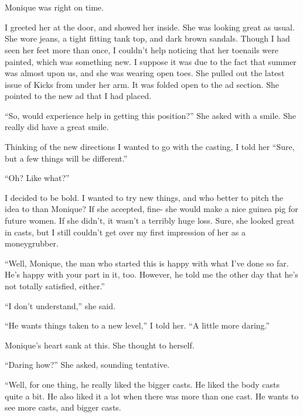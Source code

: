 \chapter{~}
Monique was right on time.

I greeted her at the door, and showed her inside. She was looking great as usual. She wore
jeans, a tight fitting tank top, and dark brown sandals. Though I had seen her feet more than
once, I couldn't help noticing that her toenails were painted, which was something new. I
suppose it was due to the fact that summer was almost upon us, and she was wearing open toes.
She pulled out the latest issue of Kicks from under her arm. It was folded open to the ad
section. She pointed to the new ad that I had placed.

``So, would experience help in getting this position?'' She asked with a smile. She really
did have a great smile.

Thinking of the new directions I wanted to go with the casting, I told her ``Sure, but a few
things will be different.''

``Oh? Like what?''

I decided to be bold. I wanted to try new things, and who better to pitch the idea to than
Monique? If she accepted, fine- she would make a nice guinea pig for future women. If she
didn't, it wasn't a terribly huge loss. Sure, she looked great in casts, but I still couldn't
get over my first impression of her as a moneygrubber.

``Well, Monique, the man who started this is happy with what I've done so far. He's happy
with your part in it, too. However, he told me the other day that he's not totally satisfied,
either.''

``I don't understand,'' she said.

``He wants things taken to a new level,'' I told her. ``A little more daring.''

Monique's heart sank at this.  She thought to herself.

``Daring how?'' She asked, sounding tentative.

``Well, for one thing, he really liked the bigger casts. He liked the body casts quite a
bit. He also liked it a lot when there was more than one cast. He wants to see more casts, and
bigger casts.


